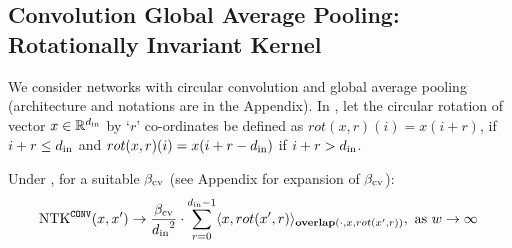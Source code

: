 \subsection{Convolution  Global Average Pooling: Rotationally Invariant Kernel}
We consider networks with circular convolution and global average pooling (architecture and notations are in the Appendix). In , let the circular rotation of vector $x\in\mathbb{R}^{d_{\text{in}}}$ by `$r$' co-ordinates be defined as $rot(x,r)(i)=x(i+ r)$, if $i+r \leq d_{\text{in}}$ and $rot(x,r)(i)=x(i+ r-d_{\text{in}})$ if $i+r > d_{\text{in}}$.  %

\begin{theorem}\label{th:conv} Under , for  a suitable $\beta_{\text{cv}}$ (see Appendix for expansion of $\beta_{\text{cv}}$):
\begin{align*}
\text{NTK}^{\texttt{CONV}}(x,x')\rightarrow  \frac{\beta_{\text{cv}}}{{d_{\text{in}}}^2} \cdot \sum_{r=0}^{d_{\text{in}}-1} \langle x,rot(x',r)\rangle_{\textbf{overlap}(\cdot, x,rot(x',r))},\,\, \text{as}\,\,  w\rightarrow\infty\,
\end{align*}
\end{theorem}
